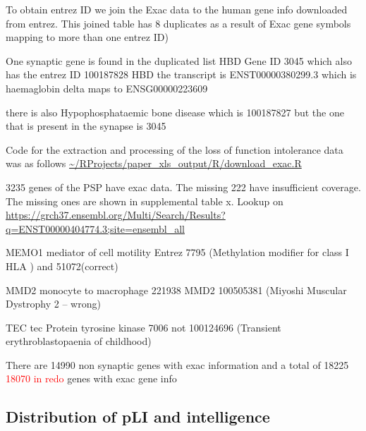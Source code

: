 To obtain entrez ID we join the Exac data to the human gene info downloaded from entrez. This joined table has 8 duplicates as a result of Exac gene symbols mapping to more than one entrez ID)

One synaptic gene is found in the duplicated list HBD Gene ID 3045 which also has the entrez ID 100187828 
HBD
the transcript is ENST00000380299.3 which is haemaglobin delta maps to ENSG00000223609

there is also Hypophosphataemic bone disease which is 100187827 but the one that is present in the synapse is 3045


Code for the extraction and processing of the loss of function intolerance data was as follows 
\url{~/RProjects/paper_xls_output/R/download_exac.R}

3235 genes of the PSP have exac data. The missing 222 have insufficient coverage. The missing ones are shown in supplemental table x.
Lookup on \url{https://grch37.ensembl.org/Multi/Search/Results?q=ENST00000404774.3;site=ensembl_all}

MEMO1 mediator of cell motility Entrez 7795 (Methylation modifier for class I HLA
) and 51072(correct)

MMD2 monocyte to macrophage 221938 MMD2 100505381 (Miyoshi Muscular Dystrophy 2 – wrong)

TEC tec Protein tyrosine kinase 7006 not 100124696 (Transient erythroblastopaenia of childhood)

There are 14990 non synaptic genes with exac information and a total of 18225 \textcolor{red}{18070 in redo} genes with exac gene info

\subsection{Distribution of pLI and intelligence}



